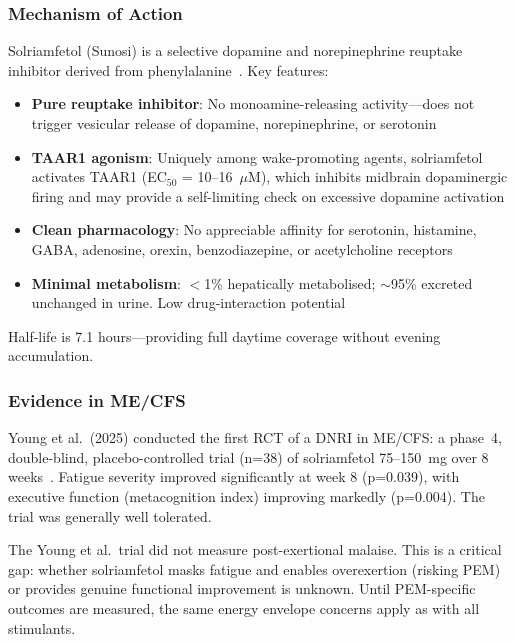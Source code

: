 \subsubsection{Mechanism of Action}

Solriamfetol (Sunosi) is a selective dopamine and norepinephrine reuptake inhibitor derived from phenylalanine~\cite{Stahl2017solriamfetol}. Key features:
\begin{itemize}
    \item \textbf{Pure reuptake inhibitor}: No monoamine-releasing activity---does not trigger vesicular release of dopamine, norepinephrine, or serotonin
    \item \textbf{TAAR1 agonism}: Uniquely among wake-promoting agents, solriamfetol activates TAAR1 (EC$_{50}$ = 10--16~$\mu$M), which inhibits midbrain dopaminergic firing and may provide a self-limiting check on excessive dopamine activation~\cite{Krief2021pitolisant}
    \item \textbf{Clean pharmacology}: No appreciable affinity for serotonin, histamine, GABA, adenosine, orexin, benzodiazepine, or acetylcholine receptors
    \item \textbf{Minimal metabolism}: $<$1\% hepatically metabolised; ${\sim}$95\% excreted unchanged in urine. Low drug-interaction potential
\end{itemize}

Half-life is 7.1 hours---providing full daytime coverage without evening accumulation.

\subsubsection{Evidence in ME/CFS}

Young et al.\ (2025) conducted the first RCT of a DNRI in ME/CFS: a phase~4, double-blind, placebo-controlled trial (n=38) of solriamfetol 75--150~mg over 8 weeks~\cite{Young2025solriamfetol}. Fatigue severity improved significantly at week 8 (p=0.039), with executive function (metacognition index) improving markedly (p=0.004). The trial was generally well tolerated.

\begin{limitation}
The Young et al.\ trial did not measure post-exertional malaise. This is a critical gap: whether solriamfetol masks fatigue and enables overexertion (risking PEM) or provides genuine functional improvement is unknown. Until PEM-specific outcomes are measured, the same energy envelope concerns apply as with all stimulants.
\end{limitation}

